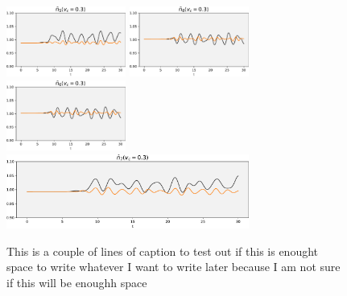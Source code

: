 \begin{figure}[!hbt]
    \includegraphics[width=0.35\textwidth]{graph/occupation/occupation_site_5_vc_03.pdf}
    \includegraphics[width=0.35\textwidth]{graph/occupation/occupation_site_8_vc_03.pdf}
    \includegraphics[width=0.35\textwidth]{graph/occupation/occupation_site_6_vc_03.pdf}
    \includegraphics[width=0.71\textwidth]{graph/occupation/occupation_site_7_vc_03.pdf}
    \caption{This is a couple of lines of caption to test out if this is enought space to write whatever I want to write later because I am not sure if this will be enoughh space }
    \label{fig:my_label}
\end{figure}

